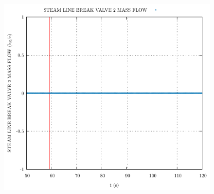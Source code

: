 \documentclass{article}
\begin{document}
\begin{multicols}{2}
\begin{figure}[H]
\end{figure}
\begin{figure}[H]
\centering
\includegraphics[width=\linewidth]{./graphs/STEAM LINE BREAK VALVE 2 MASS FLOW_comp.pdf}
\end{figure}
\end{multicols}
\end{document}
